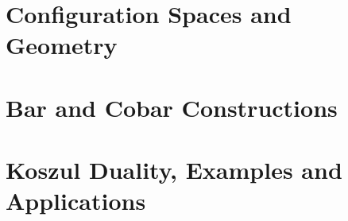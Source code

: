 \documentclass[11pt]{memoir}
\begin{document}


%

\part{Configuration Spaces and Geometry}



\part{Bar and Cobar Constructions}





\part{Koszul Duality, Examples and Applications}

















\appendix





\end{document}
